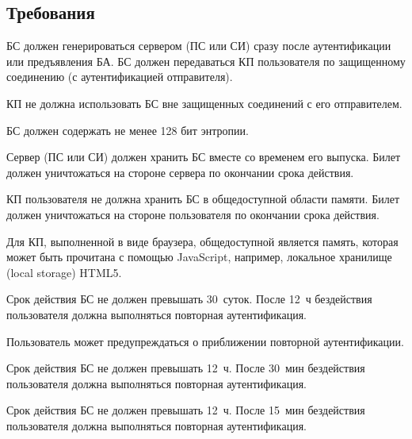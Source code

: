\subsection{Требования}\label{SM.Reqs}

БС должен генерироваться сервером (ПС или СИ) сразу после аутентификации или 
предъявления БА. БС должен передаваться КП пользователя по защищенному 
соединению (с аутентификацией отправителя). 

КП не должна использовать БС вне защищенных соединений с его отправителем. 

БС должен содержать не менее 128 бит энтропии.


Сервер (ПС или СИ) должен хранить БС вместе со временем его выпуска.
Билет должен уничтожаться на стороне сервера по окончании срока действия.

КП пользователя не должна хранить БС в общедоступной области памяти.
Билет должен уничтожаться на стороне пользователя по окончании срока действия.

\begin{note*}
Для КП, выполненной в виде браузера, общедоступной является память,
которая может быть прочитана с помощью JavaScript, например,
локальное хранилище (local storage) HTML5.
%
\end{note*}

Срок действия БС не должен превышать 30~суток. После 12~ч бездействия 
пользователя должна выполняться повторная аутентификация.

\begin{note*}
Пользователь может предупреждаться о приближении повторной аутентификации.
\end{note*}

Срок действия БС не должен превышать 12~ч. После 30~мин бездействия 
пользователя должна выполняться повторная аутентификация. 

Срок действия БС не должен превышать 12~ч. После 15~мин бездействия 
пользователя должна выполняться повторная аутентификация.

